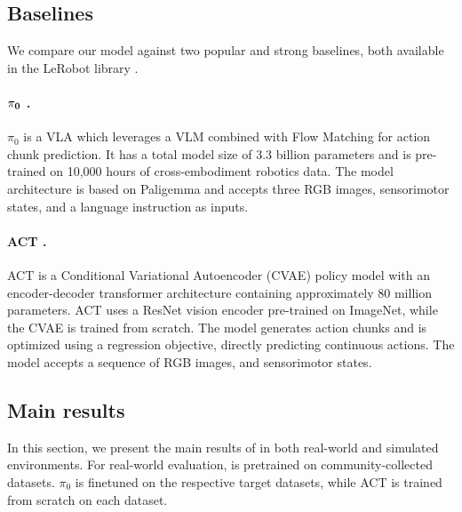 \subsection{Baselines}
We compare our model against two popular and strong baselines, both available in the LeRobot library \citep{cadene2024lerobot}.

\paragraph{\( \bf{\pi}_0 \) \citep{black2024pi_0}.}
\( \pi_0 \) is a VLA which leverages a VLM combined with Flow Matching for action chunk prediction. 
It has a total model size of 3.3 billion parameters and is pre-trained on 10,000 hours of cross-embodiment robotics data. 
The model architecture is based on Paligemma \citep{beyer2024paligemma} and accepts three RGB images, sensorimotor states, and a language instruction as inputs.

\paragraph{ACT \citep{zhao2023learningact}.}
ACT is a Conditional Variational Autoencoder (CVAE) \citep{NIPS2015_8d55a249cvae} policy model with an encoder-decoder transformer architecture containing approximately 80 million parameters. ACT uses a ResNet vision encoder pre-trained on ImageNet, while the CVAE is trained from scratch. The model generates action chunks and is optimized using a regression objective, directly predicting continuous actions. The model accepts a sequence of RGB images, and sensorimotor states.


\subsection{Main results}
In this section, we present the main results of \ours in both real-world and simulated environments. For real-world evaluation, \ours is pretrained on community-collected datasets. \( \pi_0 \) is finetuned on the respective target datasets, while ACT is trained from scratch on each dataset.




